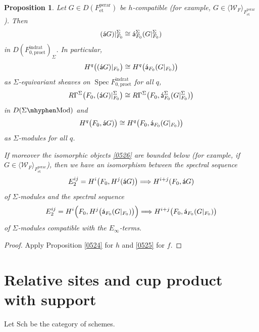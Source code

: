 \documentclass{amsart}
\newtheorem{Prop}[Thm]{Proposition}
\theoremstyle{remark}
\numberwithin{equation}{subsection}
\newcommand{\et}{\mathrm{et}}
\newcommand{\Mod}[1]{#1\mhyphen\mathrm{Mod}}
\newcommand{\rat}{\mathrm{rat}}
\newcommand{\ind}{\mathrm{ind}}
\newcommand{\pro}{\mathrm{pro}}
\newcommand{\perar}{\mathrm{perar}}
\newcommand{\algebrize}{\Acute{\mathsf{a}}}
\newcommand{\genby}[1]{\langle #1 \rangle}
\newcommand{\Sch}{\mathrm{Sch}}
\DeclareMathOperator{\Spec}{Spec}
\begin{document}
\begin{Prop} \label{0528}
	Let $G \in D(F^{\perar}_{\et})$ be $h$-compatible
	(for example, $G \in \genby{\mathcal{W}_{F}}_{F^{\perar}_{\et}}$).
	Then
		\begin{equation} \label{0526}
				(\algebrize G)|_{F_{0}}^{\Sigma}
			\cong
				\algebrize_{F_{0}}^{\Sigma}(G|_{F_{0}}^{\Sigma})
		\end{equation}
	in $D(F^{\ind\rat}_{0, \pro\et})_{\Sigma}$.
	In particular,
		\[
				H^{q} \bigl(
					(\algebrize G)|_{F_{0}}
				\bigr)
			\cong
				H^{q} \bigl(
					\algebrize_{F_{0}}(G|_{F_{0}})
				\bigr)
		\]
	as $\Sigma$-equivariant sheaves on $\Spec F^{\ind\rat}_{0, \pro\et}$ for all $q$,
		\[
				R \Gamma^{\Sigma} \bigl(
					F_{0},
					(\algebrize G)|_{F_{0}}^{\Sigma}
				\bigr)
			\cong
				R \Gamma^{\Sigma} \bigl(
					F_{0},
					\algebrize_{F_{0}}^{\Sigma}(G|_{F_{0}}^{\Sigma})
				\bigr)
		\]
	in $D(\Mod{\Sigma})$ and
		\[
				H^{q} \bigl(
					F_{0},
					\algebrize G)
				\bigr)
			\cong
				H^{q} \bigl(
					F_{0},
					\algebrize_{F_{0}}(G|_{F_{0}})
				\bigr)
		\]
	as $\Sigma$-modules for all $q$.
	
	If moreover the isomorphic objects \eqref{0526} are bounded below
	(for example, if $G \in \genby{\mathcal{W}_{F}}_{F^{\perar}_{\et}}$),
	then we have an isomorphism between the spectral sequence
		\[
				E_{2}^{i j}
			=
				H^{i} \bigl(
					F_{0},
					H^{j}(\algebrize G)
				\bigr)
			\Longrightarrow
				H^{i + j}(F_{0}, \algebrize G)
		\]
	of $\Sigma$-modules and the spectral sequence
		\[
				E_{2}^{i j}
			=
				H^{i} \Bigl(
					F_{0},
					H^{j} \bigl(
						\algebrize_{F_{0}}(G|_{F_{0}})
					\bigr)
				\Bigr)
			\Longrightarrow
				H^{i + j} \bigl(
					F_{0},
					\algebrize_{F_{0}}(G|_{F_{0}})
				\bigr)
		\]
	of $\Sigma$-modules compatible with the $E_{\infty}$-terms.
\end{Prop}

\begin{proof}
	Apply Proposition \ref{0524} for $h$ and \eqref{0525} for $f$.
\end{proof}


\section{Relative sites and cup product with support}
\label{0029}

Let $\Sch$ be the category of schemes.
\end{document}
